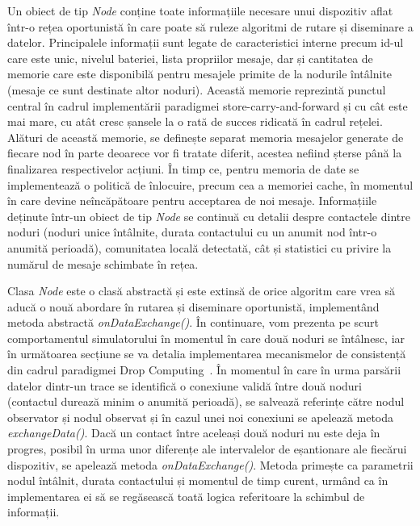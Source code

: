 \documentclass[12pt,a4paper]{report}
\begin{document}
Un obiect de tip \textit{Node} conține toate informațiile necesare unui dispozitiv aflat într-o rețea oportunistă în care poate să ruleze algoritmi de rutare și diseminare a datelor. Principalele informații sunt legate de caracteristici interne precum id-ul care este unic, nivelul bateriei, lista propriilor mesaje, dar și cantitatea de memorie care este disponibilă pentru mesajele primite de la nodurile întâlnite (mesaje ce sunt destinate altor noduri). Această memorie reprezintă punctul central în cadrul implementării paradigmei store-carry-and-forward și cu cât este mai mare, cu atât cresc șansele la o rată de succes ridicată în cadrul rețelei. Alături de această memorie, se definește separat memoria mesajelor generate de fiecare nod în parte deoarece vor fi tratate diferit, acestea nefiind șterse până la finalizarea respectivelor acțiuni. În timp ce, pentru memoria de date se implementează o politică de înlocuire, precum cea a memoriei cache, în momentul în care devine neîncăpătoare pentru acceptarea de noi mesaje. 
Informațiile deținute într-un obiect de tip \textit{Node} se continuă cu detalii despre contactele dintre noduri (noduri unice întâlnite, durata contactului cu un anumit nod într-o anumită perioadă), comunitatea locală detectată, cât și statistici cu privire la numărul de mesaje schimbate în rețea. 

Clasa \textit{Node} este o clasă abstractă și este extinsă de orice algoritm care vrea să aducă o nouă abordare în rutarea și diseminare oportunistă, implementând metoda abstractă \textit{onDataExchange()}. În continuare, vom prezenta pe scurt comportamentul simulatorului în momentul în care două noduri se întâlnesc, iar în următoarea secțiune se va detalia implementarea mecanismelor de consistență din cadrul paradigmei Drop Computing~\cite{DC}. În momentul în care în urma parsării datelor dintr-un trace se identifică o conexiune validă între două noduri (contactul durează minim o anumită perioadă), se salvează referințe către nodul observator și nodul observat și în cazul unei noi conexiuni se apelează metoda \textit{exchangeData()}. Dacă un contact între aceleași două noduri nu este deja în progres, posibil în urma unor diferențe ale intervalelor de eșantionare ale fiecărui dispozitiv, se apelează metoda \textit{onDataExchange()}. Metoda primește ca parametrii nodul întâlnit, durata contactului și momentul de timp curent, urmând ca în implementarea ei să se regăsească toată logica referitoare la schimbul de informații. 
\end{document}
